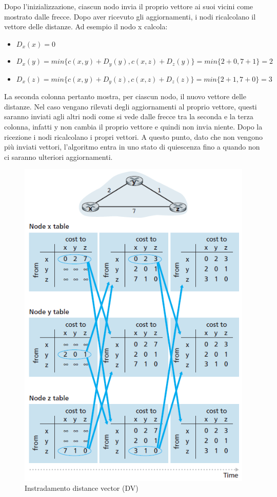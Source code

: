\documentclass[11pt,a4paper]{article}
\begin{document}
Dopo l'inizializzazione, ciascun nodo invia il proprio vettore ai suoi vicini come mostrato dalle frecce. Dopo aver ricevuto gli aggiornamenti, i nodi ricalcolano il vettore delle distanze. Ad esempio il nodo x calcola:
\begin{itemize}
	\item $D_{x}(x) = 0$
	\item $D_{x}(y) = min\{c(x, y) + D_{y}(y), c(x, z) + D_{z}(y)\} = min\{2 + 0, 7 + 1\} = 2$
	\item $D_{x}(z) = min\{c(x, y) + D_{y}(z), c(x, z) + D_{z}(z)\} = min\{2 + 1, 7 + 0\} = 3$
\end{itemize}
La seconda colonna pertanto mostra, per ciascun nodo, il nuovo vettore delle distanze. Nel caso vengano rilevati degli aggiornamenti al proprio vettore, questi saranno inviati agli altri nodi come si vede dalle frecce tra la seconda e la terza colonna, infatti y non cambia il proprio vettore e quindi non invia niente. Dopo la ricezione i nodi ricalcolano i propri vettori. A questo punto, dato che non vengono più inviati vettori, l'algoritmo entra in uno stato di quiescenza fino a quando non ci saranno ulteriori aggiornamenti.
\begin{figure}
	\begin{center}
		\includegraphics[scale=1]{img/064.png}
		\caption{Instradamento distance vector (DV)}
		\label{fig: 064}
	\end{center}
\end{figure}
\end{document}
